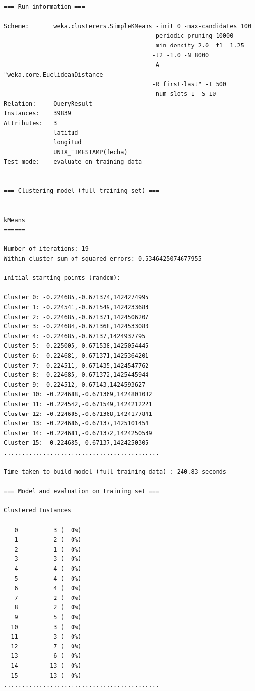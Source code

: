 \documentclass[a4paper, 12pt]{article}
\begin{document}
\begin{verbatim}

=== Run information ===

Scheme:       weka.clusterers.SimpleKMeans -init 0 -max-candidates 100 
										  -periodic-pruning 10000 
										  -min-density 2.0 -t1 -1.25 
										  -t2 -1.0 -N 8000 
										  -A "weka.core.EuclideanDistance 
										  -R first-last" -I 500 
										  -num-slots 1 -S 10
Relation:     QueryResult
Instances:    39839
Attributes:   3
              latitud
              longitud
              UNIX_TIMESTAMP(fecha)
Test mode:    evaluate on training data


=== Clustering model (full training set) ===


kMeans
======

Number of iterations: 19
Within cluster sum of squared errors: 0.6346425074677955

Initial starting points (random):

Cluster 0: -0.224685,-0.671374,1424274995
Cluster 1: -0.224541,-0.671549,1424233683
Cluster 2: -0.224685,-0.671371,1424506207
Cluster 3: -0.224684,-0.671368,1424533080
Cluster 4: -0.224685,-0.67137,1424937795
Cluster 5: -0.225005,-0.671538,1425054445
Cluster 6: -0.224681,-0.671371,1425364201
Cluster 7: -0.224511,-0.671435,1424547762
Cluster 8: -0.224685,-0.671372,1425445944
Cluster 9: -0.224512,-0.67143,1424593627
Cluster 10: -0.224688,-0.671369,1424801082
Cluster 11: -0.224542,-0.671549,1424212221
Cluster 12: -0.224685,-0.671368,1424177841
Cluster 13: -0.224686,-0.67137,1425101454
Cluster 14: -0.224681,-0.671372,1424250539
Cluster 15: -0.224685,-0.67137,1424250305
............................................

Time taken to build model (full training data) : 240.83 seconds

=== Model and evaluation on training set ===

Clustered Instances

   0          3 (  0%)
   1          2 (  0%)
   2          1 (  0%)
   3          3 (  0%)
   4          4 (  0%)
   5          4 (  0%)
   6          4 (  0%)
   7          2 (  0%)
   8          2 (  0%)
   9          5 (  0%)
  10          3 (  0%)
  11          3 (  0%)
  12          7 (  0%)
  13          6 (  0%)
  14         13 (  0%)
  15         13 (  0%)
............................................

\end{verbatim}

\end{document}
